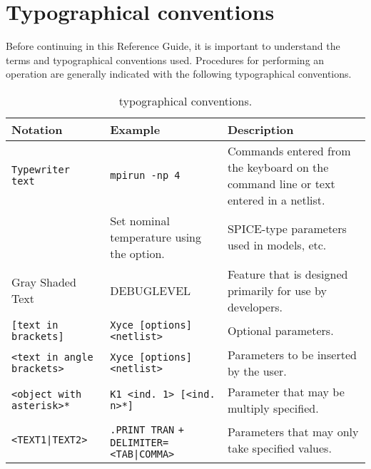\section{Typographical conventions}
Before continuing in this Reference Guide, it is important to understand 
the terms and typographical conventions used.  Procedures for performing 
an operation are generally indicated with the following typographical 
conventions.

\begin{table}[htbp]
  \caption{\Xyce{} typographical conventions.}
  \begin{tabularx}{\linewidth}{|Y|Y|Y|}
     \color{white}\bf Notation & \color{white}\bf
    Example & \color{white}\bf Description \\ \hline

    \texttt{Typewriter text} & \texttt{mpirun -np 4}
    & Commands entered
    from the keyboard on the command line or text entered in a netlist. \\
    \hline

     & Set nominal temperature using the
     option. & SPICE-type parameters used in models, etc. \\
    \hline

     Gray Shaded Text &  DEBUGLEVEL
    & Feature that is designed primarily for use by \Xyce{}
    developers. \\ \hline

    \texttt{[text in brackets]} & \texttt{Xyce [options] <netlist>} & Optional parameters. \\ \hline

    \texttt{<text in angle brackets>} & \texttt{Xyce [options] <netlist>} &
    Parameters to be inserted by the user. \\ \hline

    \texttt{<object with asterisk>*} & \texttt{K1 <ind. 1> [<ind. n>*]} &
    Parameter that may be multiply specified. \\ \hline

    \texttt{<TEXT1|TEXT2>}&
    \texttt{.PRINT TRAN}
    \verb-+     DELIMITER=<TAB|COMMA>- & Parameters that may only take specified values. \\ \hline

  \end{tabularx}
\end{table}

